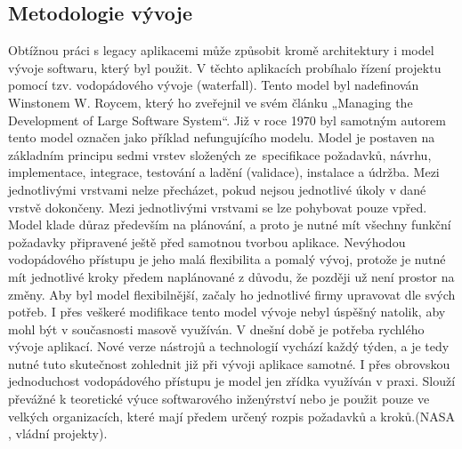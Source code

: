 \subsection{Metodologie vývoje}
Obtížnou práci s legacy aplikacemi může způsobit kromě architektury i model vývoje softwaru, který byl použit. V těchto aplikacích probíhalo řízení projektu pomocí tzv. vodopádového vývoje (waterfall). Tento model byl nadefinován Winstonem W. Roycem, který ho zveřejnil ve svém článku „Managing the Development of Large Software System“. Již v roce 1970 byl samotným autorem tento model označen jako příklad nefungujícího modelu. Model je postaven na základním principu sedmi vrstev složených ze specifikace požadavků, návrhu, implementace, integrace, testování a ladění (validace), instalace a údržba. Mezi jednotlivými vrstvami nelze přecházet, pokud nejsou jednotlivé úkoly v dané vrstvě dokončeny. Mezi jednotlivými vrstvami se lze pohybovat pouze vpřed. Model klade důraz především na plánování, a proto je nutné mít všechny funkční požadavky připravené ještě před samotnou tvorbou aplikace. Nevýhodou vodopádového přístupu je jeho malá flexibilita a pomalý vývoj, protože je nutné mít jednotlivé kroky předem naplánované z důvodu, že později už není prostor na změny. Aby byl model flexibilnější, začaly ho jednotlivé firmy upravovat dle svých potřeb. I přes veškeré modifikace tento model vývoje nebyl úspěšný natolik, aby mohl být v současnosti masově využíván. V dnešní době je potřeba rychlého vývoje aplikací. Nové verze nástrojů a technologií vychází každý týden, a je tedy nutné tuto skutečnost zohlednit již při vývoji aplikace samotné. I přes obrovskou jednoduchost vodopádového přístupu je model jen zřídka využíván v praxi. Slouží převážné k teoretické výuce softwarového inženýrství nebo je použit pouze ve velkých organizacích, které mají předem určený rozpis požadavků a kroků.(NASA \cite{NASA_legacy}, vládní projekty).

